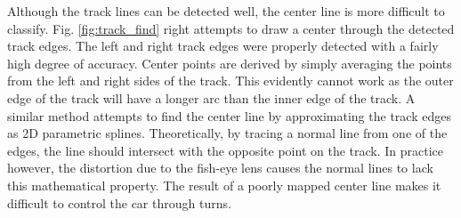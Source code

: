 \documentclass{article}
\begin{document}
Although the track lines can be detected well, the center line is more difficult to classify. Fig. \ref{fig:track_find} right attempts to draw a center through the detected track edges. The left and right track edges were properly detected with a fairly high degree of accuracy. Center points are derived by simply averaging the points from the left and right sides of the track. This evidently cannot work as the outer edge of the track will have a longer arc than the inner edge of the track. A similar method attempts to find the center line by approximating the track edges as 2D parametric splines. Theoretically, by tracing a normal line from one of the edges, the line should intersect with the opposite point on the track. In practice however, the distortion due to the fish-eye lens causes the normal lines to lack this mathematical property. The result of a poorly mapped center line makes it difficult to control the car through turns.
\end{document}

